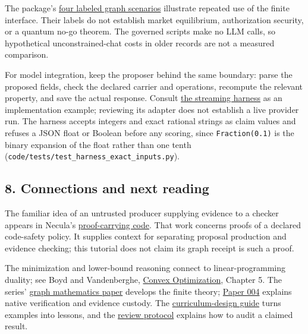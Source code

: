 \documentclass[
  11pt,
]{article}
\begin{document}
The package's \href{code/multi_domain_symbol_game_bouts.py}{four labeled
graph scenarios} illustrate repeated use of the finite interface. Their
labels do not establish market equilibrium, authorization security, or a
quantum no-go theorem. The governed scripts make no LLM calls, so
hypothetical unconstrained-chat costs in older records are not a
measured comparison.

For model integration, keep the proposer behind the same boundary: parse
the proposed fields, check the declared carrier and operations,
recompute the relevant property, and save the actual response. Consult
\href{code/llm_streaming_harness.py}{the streaming harness} as an
implementation example; reviewing its adapter does not establish a live
provider run. The harness accepts integers and exact rational strings as
claim values and refuses a JSON float or Boolean before any scoring,
since \nolinkurl{Fraction(0.1)} is the binary expansion of the float
rather than one tenth
(\nolinkurl{code/tests/test_harness_exact_inputs.py}).

\subsection{8. Connections and next
reading}\label{connections-and-next-reading}

The familiar idea of an untrusted producer supplying evidence to a
checker appears in Necula's
\href{https://doi.org/10.1145/263699.263712}{proof-carrying code}. That
work concerns proofs of a declared code-safety policy. It supplies
context for separating proposal production and evidence checking; this
tutorial does not claim its graph receipt is such a proof.

The minimization and lower-bound reasoning connect to linear-programming
duality; see Boyd and Vandenberghe,
\href{https://doi.org/10.1017/CBO9780511804441}{Convex Optimization},
Chapter 5. The series'
\href{https://github.com/dbccpage/the_symbol_game/blob/59dde95a7860063c25d75db37f40af556e9f28ee/atlas/coda_atlas/F004_papers/015_pfp/001_pfp_discrete_cochain_retraction_and_toy_involutions/paper.md}{graph
mathematics paper} develops the finite theory;
\href{../004/paper.pdf}{Paper 004} explains native verification and
evidence custody. The
\href{https://github.com/dbccpage/the_symbol_game/blob/59dde95a7860063c25d75db37f40af556e9f28ee/atlas/coda_atlas/F004_papers/015_pfp/007_pfp_executable_lessons_and_evidence_boundaries/paper.md}{curriculum-design
guide} turns examples into lessons, and the
\href{../009/paper.pdf}{review protocol} explains how to audit a claimed
result.
\end{document}
